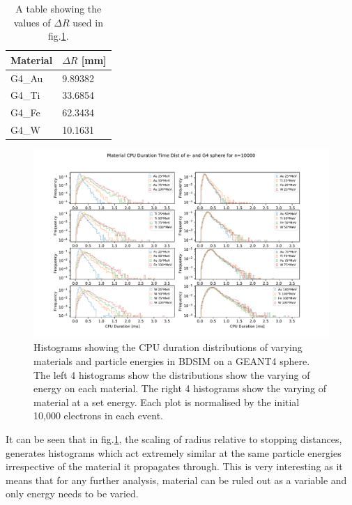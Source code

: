 \documentclass[12pt,a4paper]{article}
\begin{document}
\begin{table}[h!]
\centering
\begin{tabular}{|l|l|}
\hline
Material & $\Delta R$ [mm] \\ \hline
G4\_Au &  9.89382\\ \hline
G4\_Ti &  33.6854\\ \hline
G4\_Fe &  62.3434\\ \hline
G4\_W &  10.1631\\ \hline
\end{tabular}
\caption{A table showing the values of $\Delta R$ used in fig.\ref{var}.}
\label{rs}
\end{table}

\begin{figure}[h!]
\centering
\includegraphics[scale=0.6]{Images//Materials//Varied_by_radius_and_secondaries.pdf}
\caption[width=\columnwidth]{Histograms showing the CPU duration distributions of varying materials and particle energies in BDSIM on a GEANT4 sphere. The left 4 histograms show the distributions show the varying of energy on each material. The right 4 histograms show the varying of material at a set energy. Each plot is normalised by the initial 10,000 electrons in each event.}
\label{var}
\end{figure}

\noindent It can be seen that in fig.\ref{var}, the scaling of radius relative to stopping distances, generates histograms which act extremely similar at the same particle energies irrespective of the material it propagates through. This is very interesting as it means that for any further analysis, material can be ruled out as a variable and only energy needs to be varied.
\end{document}
